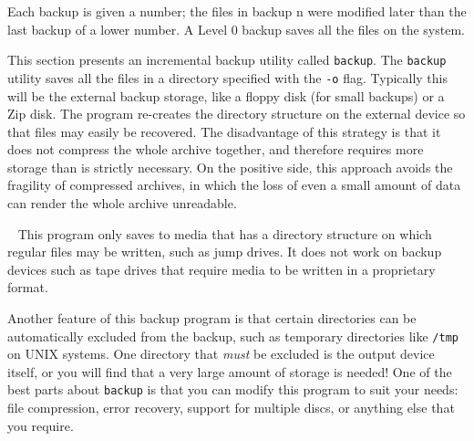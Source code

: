 Each backup is given a number; the files in backup n were
modified later than the last backup of a lower number. A Level 0 backup
saves all the files on the system.

This section presents an incremental backup utility called
\texttt{backup}. The \texttt{backup} utility saves all the files in a
directory specified with the \texttt{{}-o} flag. Typically this will be
the external backup storage, like a floppy disk (for small backups) or
a Zip disk. The program re-creates the directory structure on the
external device so that files may easily be recovered. The disadvantage
of this strategy is that it does not compress the whole archive
together, and therefore requires more storage than is strictly
necessary. On the positive side, this approach avoids the fragility of
compressed archives, in which the loss of even a small amount of data
can render the whole archive unreadable.

\medskip{}\ {\sffamily
This program only saves to media that has a directory structure on which
regular files may be written, such as jump drives. It does not work on backup
devices such as tape drives that require media to be written in a
proprietary format.}\medskip

Another feature of this backup program is that certain directories can
be automatically excluded from the backup, such as temporary
directories like \texttt{/tmp} on UNIX systems. One directory that
{\em must\/} be excluded is the output device itself, or you will
find that a very large amount of storage is needed! One of the best
parts about \texttt{backup} is that you can modify this program to suit
your needs: file compression, error recovery, support for multiple
discs, or anything else that you require.

